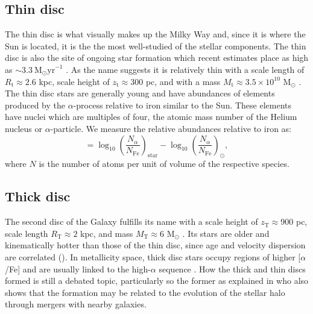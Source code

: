 \subsection{Thin disc}\label{subsec:components-thindisc}
The thin disc is what visually makes up the Milky Way and, since it is where the Sun is located, it is the the most well-studied of the stellar components. The thin disc is also the site of ongoing star formation which recent estimates place as high as ${\sim}3.3\ \mathrm{M_\odot yr}^{-1}$ \citep{zari:22}. As the name suggests it is relatively thin with a scale length of $R_\mathrm{t} \approx 2.6$ kpc, scale height of $z_\mathrm{t} \approx 300$ pc, and with a mass $M_\mathrm{t} \approx 3.5\times 10^{10}$ M$_\odot$ \citep{bland-hawthorn:16}. The thin disc stars are generally young and have abundances of elements produced by the $\alpha$-process \citep{burbidge:57} relative to iron similar to the Sun. These elements have nuclei which are multiples of four, the atomic mass number of the Helium nucleus or $\alpha$-particle. We measure the relative abundances relative to iron as:
\begin{equation}
    [\alpha/\mathrm{Fe}] = \log_{10}\left(\frac{N_\alpha}{N_\mathrm{Fe}}\right)_\mathrm{star} - \log_{10}\left(\frac{N_\alpha}{N_\mathrm{Fe}}\right)_\odot,
\end{equation}
where $N$ is the number of atoms per unit of volume of the respective species.

\subsection{Thick disc}\label{subsec:components-thickdisc}
The second disc of the Galaxy fulfills its name with a scale height of $z_\mathrm{T}\approx 900$ pc, scale length $R_\mathrm{T} \approx 2$ kpc, and mass $M_\mathrm{T} \approx 6$ M$_\odot$ \citep{bland-hawthorn:16}. Its stars are older \citep{bensby:14,martig:16} and kinematically hotter than those of the thin disc, since age and velocity dispersion are correlated (\citealt{martig:14,aumer:16}). In metallicity space, thick disc stars occupy regions of higher [$\alpha$/Fe] and are usually linked to the high-$\alpha$ sequence \citep{katz:21}. How the thick and thin discs formed is still a debated topic, particularly so the former as explained in \cite{helmi:20} who also shows that the formation may be related to the evolution of the stellar halo through mergers with nearby galaxies. 

